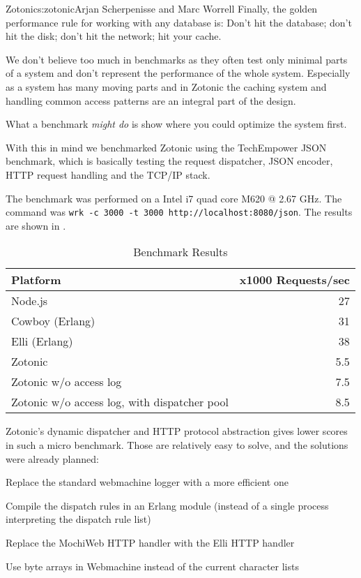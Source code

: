 \begin{aosachapter}{Zotonic}{s:zotonic}{Arjan Scherpenisse and Marc Worrell}
Finally, the golden performance rule for working with any database is:
Don't hit the database; don't hit the disk; don't hit the network; hit
your cache.


We don't believe too much in benchmarks as they often test only minimal
parts of a system and don't represent the performance of the whole
system. Especially as a system has many moving parts and in Zotonic the
caching system and handling common access patterns are an integral part
of the design.


What a benchmark \emph{might do} is show where you could optimize the
system first.

With this in mind we benchmarked Zotonic using the TechEmpower JSON
benchmark, which is basically testing the request dispatcher, JSON
encoder, HTTP request handling and the TCP/IP stack.

The benchmark was performed on a Intel i7 quad core M620 @ 2.67 GHz. The
command was \texttt{wrk -c 3000 -t 3000 http://localhost:8080/json}. The
results are shown in .

\begin{table}[h!]
\centering
{\footnotesize
{}
\begin{tabular}{lr}
\hline
\textbf{Platform}
& \textbf{x1000 Requests/sec}
\\
\hline
Node.js
& 27
\\
Cowboy (Erlang)
& 31
\\
Elli (Erlang)
& 38
\\
Zotonic
& 5.5
\\
Zotonic w/o access log
& 7.5
\\
Zotonic w/o access log, with dispatcher pool
& 8.5
\\
\hline
\end{tabular}
}
\caption{Benchmark Results}
\label{posa.zotonic.bmark}
\end{table}

Zotonic's dynamic dispatcher and HTTP protocol abstraction gives lower
scores in such a micro benchmark. Those are relatively easy to solve,
and the solutions were already planned:

\begin{aosaitemize}

\item
  Replace the standard webmachine logger with a more efficient one
\item
  Compile the dispatch rules in an Erlang module (instead of a single
  process interpreting the dispatch rule list)
\item
  Replace the MochiWeb HTTP handler with the Elli HTTP handler
\item
  Use byte arrays in Webmachine instead of the current character lists
\end{aosaitemize}


\end{aosachapter}
